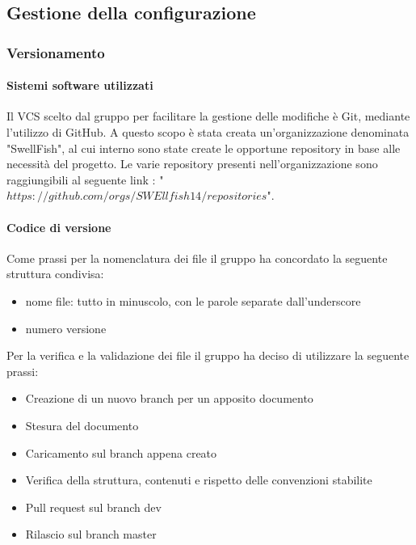 \documentclass[12pt]{article}
\begin{document}
\subsection{Gestione della configurazione}
\subsubsection{Versionamento}
\paragraph{Sistemi software utilizzati}
Il VCS scelto dal gruppo per facilitare la gestione delle modifiche è Git, mediante l'utilizzo di GitHub.
A questo scopo è stata creata un'organizzazione denominata "SwellFish", al cui interno sono state create le opportune repository in base alle necessità del progetto.
Le varie repository presenti nell'organizzazione sono raggiungibili al seguente link : "$https://github.com/orgs/SWEllfish14/repositories$".

\paragraph{Codice di versione}
Come prassi per la nomenclatura dei file il gruppo ha concordato la seguente struttura condivisa:
\begin{itemize}
    \item nome file: tutto in minuscolo, con le parole separate dall'underscore
    \item numero versione
\end{itemize}

Per la verifica e la validazione dei file il gruppo ha deciso di utilizzare la seguente prassi:
\begin{itemize}
    \item Creazione di un nuovo branch per un apposito documento
    \item Stesura del documento
    \item Caricamento sul branch appena creato
    \item Verifica della struttura, contenuti e rispetto delle convenzioni stabilite
    \item Pull request sul branch dev
    \item Rilascio sul branch master
\end{itemize}
\end{document}
